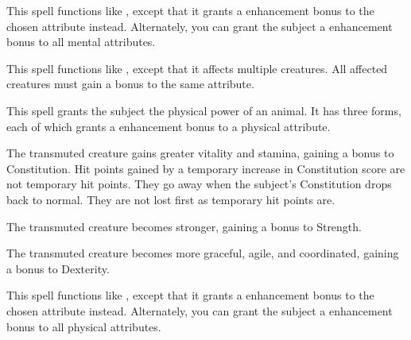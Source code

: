 \begin{spelleffect}
    This spell functions like , except that it grants a  enhancement bonus to the chosen attribute instead. Alternately, you can grant the subject a  enhancement bonus to all mental attributes.
\end{spelleffect}

\spellrng{\rngmed}
\begin{spelleffect}
  This spell functions like , except that it affects multiple creatures. All affected creatures must gain a bonus to the same attribute.
\end{spelleffect}

\spellrng{\rngtouch}
\spelldur{\durshort}
\begin{spelleffect}
  This spell grants the subject the physical power of an animal. It has three forms, each of which grants a  enhancement bonus to a physical attribute.
  \par {} The transmuted creature gains greater vitality and stamina, gaining a bonus to Constitution. Hit points gained by a temporary increase in Constitution score are not temporary hit points. They go away when the subject's Constitution drops back to normal. They are not lost first as temporary hit points are.
  \par {} The transmuted creature becomes stronger, gaining a bonus to Strength.
  \par {} The transmuted creature becomes more graceful, agile, and coordinated, gaining a bonus to Dexterity.
\end{spelleffect}

\begin{spelleffect}
    This spell functions like , except that it grants a  enhancement bonus to the chosen attribute instead. Alternately, you can grant the subject a  enhancement bonus to all physical attributes.
\end{spelleffect}

